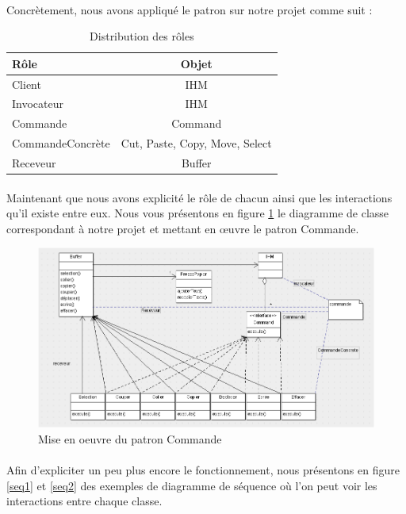 \documentclass[a4paper,11pt]{article}
\begin{document}
\paragraph{}
Concrètement, nous avons appliqué le patron sur notre projet comme suit : \\

\begin{table}[H]
\caption{Distribution des rôles}
\center
\begin{tabular}{||l|c||}
\hline
\textbf{Rôle} & \textbf{Objet}\\
\hline\hline
Client & IHM \\
\hline
Invocateur & IHM \\
\hline
Commande & Command \\
\hline
CommandeConcrète & Cut, Paste, Copy, Move,  Select \\
\hline
Receveur & Buffer \\
\hline
\end{tabular}
\end{table}

\paragraph{}
Maintenant que nous avons explicité le rôle de chacun ainsi que les interactions qu'il existe entre eux. Nous vous présentons en figure \ref{command} le diagramme de classe correspondant à notre projet et mettant en œuvre le patron Commande.

\begin{figure}[!ht]
		\center
		\includegraphics [width=15cm]{Command.png}
		\caption{Mise en oeuvre du patron Commande}
		\label{command}
\end{figure}

\paragraph{}
Afin d'expliciter un peu plus encore le fonctionnement, nous présentons en figure \ref{seq1} et \ref{seq2} des exemples de diagramme de séquence où l'on peut voir les interactions entre chaque classe.
\end{document}
